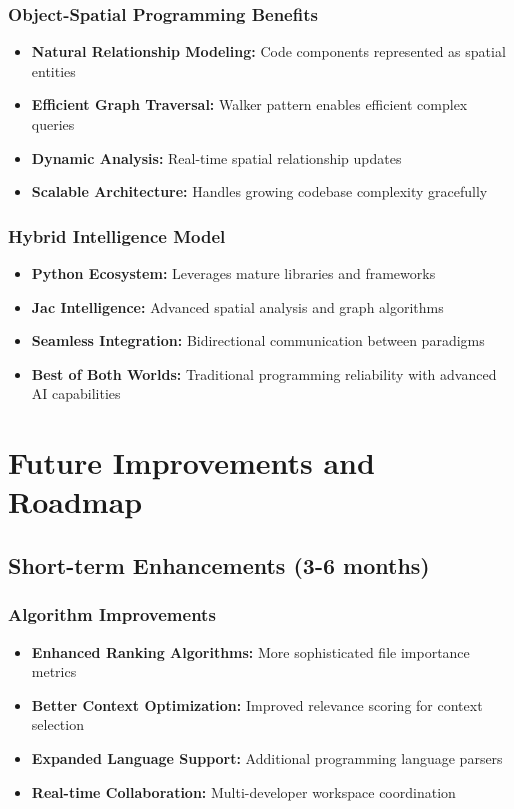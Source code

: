 \documentclass[12pt,a4paper]{article}
\begin{document}
\subsubsection{Object-Spatial Programming Benefits}
\begin{itemize}
    \item \textbf{Natural Relationship Modeling:} Code components represented as spatial entities
    \item \textbf{Efficient Graph Traversal:} Walker pattern enables efficient complex queries
    \item \textbf{Dynamic Analysis:} Real-time spatial relationship updates
    \item \textbf{Scalable Architecture:} Handles growing codebase complexity gracefully
\end{itemize}

\subsubsection{Hybrid Intelligence Model}
\begin{itemize}
    \item \textbf{Python Ecosystem:} Leverages mature libraries and frameworks
    \item \textbf{Jac Intelligence:} Advanced spatial analysis and graph algorithms
    \item \textbf{Seamless Integration:} Bidirectional communication between paradigms
    \item \textbf{Best of Both Worlds:} Traditional programming reliability with advanced AI capabilities
\end{itemize}

\section{Future Improvements and Roadmap}

\subsection{Short-term Enhancements (3-6 months)}

\subsubsection{Algorithm Improvements}
\begin{itemize}
    \item \textbf{Enhanced Ranking Algorithms:} More sophisticated file importance metrics
    \item \textbf{Better Context Optimization:} Improved relevance scoring for context selection
    \item \textbf{Expanded Language Support:} Additional programming language parsers
    \item \textbf{Real-time Collaboration:} Multi-developer workspace coordination
\end{itemize}
\end{document}
